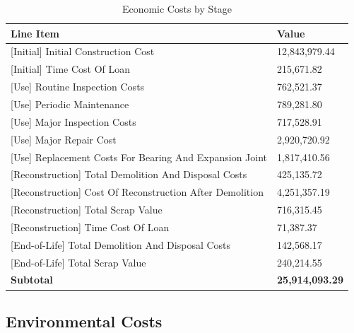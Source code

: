\documentclass[12pt,a4paper]{article}
\begin{document}
\begin{table}[H]
\centering
\caption{Economic Costs by Stage}
\begin{tabular}{L{9cm}R{5cm}}
\toprule
\textbf{Line Item} & \textbf{Value} \\
\midrule
  \mbox{[Initial]} Initial Construction Cost & 12,843,979.44 \\
  \mbox{[Initial]} Time Cost Of Loan & 215,671.82 \\
  \mbox{[Use]} Routine Inspection Costs & 762,521.37 \\
  \mbox{[Use]} Periodic Maintenance & 789,281.80 \\
  \mbox{[Use]} Major Inspection Costs & 717,528.91 \\
  \mbox{[Use]} Major Repair Cost & 2,920,720.92 \\
  \mbox{[Use]} Replacement Costs For Bearing And Expansion Joint & 1,817,410.56 \\
  \mbox{[Reconstruction]} Total Demolition And Disposal Costs & 425,135.72 \\
  \mbox{[Reconstruction]} Cost Of Reconstruction After Demolition & 4,251,357.19 \\
  \mbox{[Reconstruction]} Total Scrap Value & 716,315.45 \\
  \mbox{[Reconstruction]} Time Cost Of Loan & 71,387.37 \\
  \mbox{[End-of-Life]} Total Demolition And Disposal Costs & 142,568.17 \\
  \mbox{[End-of-Life]} Total Scrap Value & 240,214.55 \\
\midrule
  \textbf{Subtotal} & \textbf{25,914,093.29} \\
\bottomrule
\end{tabular}
\end{table}


\subsection{Environmental Costs}
\end{document}
